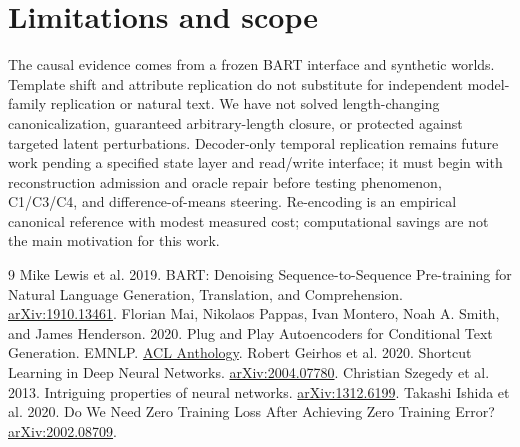 \documentclass[11pt]{article}
\begin{document}
\section{Limitations and scope}
The causal evidence comes from a frozen BART interface and synthetic worlds.
Template shift and attribute replication do not substitute for independent
model-family replication or natural text. We have not solved length-changing
canonicalization, guaranteed arbitrary-length closure, or protected against
targeted latent perturbations. Decoder-only temporal replication remains
future work pending a specified state layer and read/write interface; it must
begin with reconstruction admission and oracle repair before testing
phenomenon, C1/C3/C4, and difference-of-means steering. Re-encoding is an
empirical canonical reference with modest measured cost; computational savings
are not the main motivation for this work.

\begin{thebibliography}{9}
 Mike Lewis et al. 2019.
BART: Denoising Sequence-to-Sequence Pre-training for Natural Language
Generation, Translation, and Comprehension. \href{https://arxiv.org/abs/1910.13461}{arXiv:1910.13461}.
 Florian Mai, Nikolaos Pappas, Ivan Montero,
Noah A. Smith, and James Henderson. 2020.
Plug and Play Autoencoders for Conditional Text Generation. EMNLP.
\href{https://aclanthology.org/2020.emnlp-main.491/}{ACL Anthology}.
 Robert Geirhos et al. 2020.
Shortcut Learning in Deep Neural Networks.
\href{https://arxiv.org/abs/2004.07780}{arXiv:2004.07780}.
 Christian Szegedy et al. 2013.
Intriguing properties of neural networks.
\href{https://arxiv.org/abs/1312.6199}{arXiv:1312.6199}.
 Takashi Ishida et al. 2020.
Do We Need Zero Training Loss After Achieving Zero Training Error?
\href{https://arxiv.org/abs/2002.08709}{arXiv:2002.08709}.
\end{thebibliography}
\end{document}
